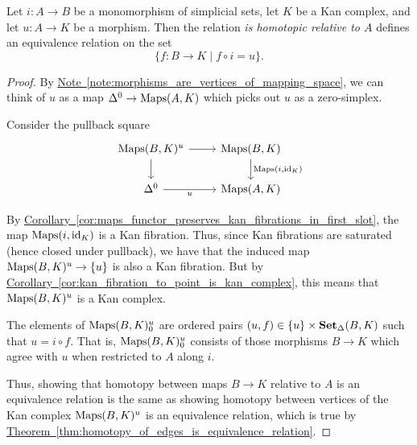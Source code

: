 \documentclass[main.tex]{subfiles}
\begin{document}
\begin{proposition}
  \label{prop:relative_homotopy_defines_equiv_relation_on_kan_complex}
  Let $i\colon A \to B$ be a monomorphism of simplicial sets, let $K$ be a Kan complex, and let $u\colon A \to K$ be a morphism. Then the relation \emph{is homotopic relative to $A$} defines an equivalence relation on the set
  \begin{equation*}
    \{ f\colon B \to K \mid f \circ i = u \}.
  \end{equation*}
\end{proposition}
\begin{proof}
  By \hyperref[note:morphisms_are_vertices_of_mapping_space]{Note~\ref*{note:morphisms_are_vertices_of_mapping_space}}, we can think of $u$ as a map $\Delta^{0} \to \operatorname{Maps}(A, K)$ which picks out $u$ as a zero-simplex.

  Consider the pullback square
  \begin{equation*}
    \begin{tikzcd}
      \Maps(B, K)^{u}
      \arrow[r]
      \arrow[d]
      & \Maps(B, K)
      \arrow[d, "{\Maps(i, \id_{K})}"]
      \\
      \Delta^{0}
      \arrow[r, swap, "u"]
      & \Maps(A, K)
    \end{tikzcd}
  \end{equation*}

  By \hyperref[cor:maps_functor_preserves_kan_fibrations_in_first_slot]{Corollary~\ref*{cor:maps_functor_preserves_kan_fibrations_in_first_slot}}, the map $\operatorname{Maps}(i, \mathrm{id}_{K})$ is a Kan fibration. Thus, since Kan fibrations are saturated (hence closed under pullback), we have that the induced map $\operatorname{Maps}(B, K)^{u} \to \{u\}$ is also a Kan fibration. But by \hyperref[cor:kan_fibration_to_point_is_kan_complex]{Corollary~\ref*{cor:kan_fibration_to_point_is_kan_complex}}, this means that $\operatorname{Maps}(B, K)^{u}$ is a Kan complex.

  The elements of $\operatorname{Maps}(B, K)^{u}_{0}$ are ordered pairs $(u, f) \in \{u\} \times \operatorname{\mathbf{Set}_{\Delta}}(B, K)$ such that $u = i \circ f$. That is, $\operatorname{Maps}(B, K)^{u}_{0}$ consists of those morphisms $B \to K$ which agree with $u$ when restricted to $A$ along $i$.

  Thus, showing that homotopy between maps $B \to K$ relative to $A$ is an equivalence relation is the same as showing homotopy between vertices of the Kan complex $\operatorname{Maps}(B, K)^{u}$ is an equivalence relation, which is true by \hyperref[thm:homotopy_of_edges_is_equivalence_relation]{Theorem~\ref*{thm:homotopy_of_edges_is_equivalence_relation}}.
\end{proof}
\end{document}
